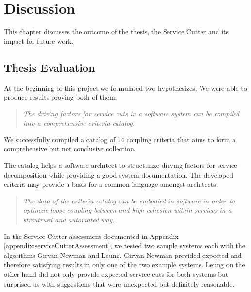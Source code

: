 \chapter{Discussion}

This chapter discusses the outcome of the thesis, the Service Cutter and its impact for future work.



\section{Thesis Evaluation}

At the beginning of this project we formulated two hypothesizes. We were able to produce results proving both of them.

\begin{quote}
	\textit{The driving factors for service cuts in a software system can be compiled into a comprehensive criteria catalog.}
\end{quote}

We successfully compiled a catalog of 14 coupling criteria that aims to form a comprehensive but not conclusive collection. 

The catalog helps a software architect to structurize driving factors for service decomposition while providing a good system documentation. The developed criteria may provide a basis for a common language amongst architects. 


\begin{quote}
	\textit{The data of the criteria catalog can be embodied in software in order to optimzie loose coupling between and high cohesion within services in a strcutrued and automated way.}
\end{quote}

In the Service Cutter assessment documented in Appendix \ref{appendix:serviceCutterAssessment}, we tested two sample systems each with the algorithms Girvan-Newman and Leung. Girvan-Newman provided expected and therefore satisfying results in only one of the two example systems. Leung on the other hand did not only provide expected service cuts for both systems but surprised us with suggestions that were unexpected but definitely reasonable.  


